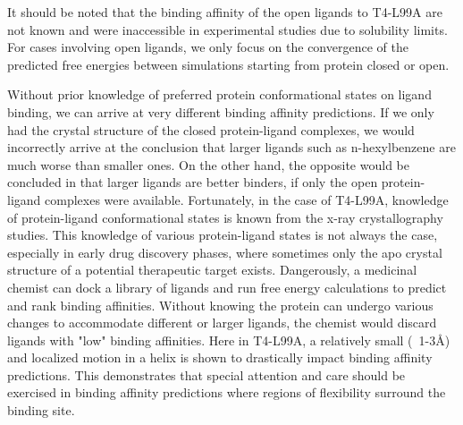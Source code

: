 \documentclass{article}
\begin{document}
It should be noted that the binding affinity of the open ligands to T4-L99A are not known and were inaccessible in experimental studies due to solubility limits. \cite{Merski2015}
For cases involving open ligands, we only focus on the convergence of the predicted free energies between simulations starting from protein closed or open.

Without prior knowledge of preferred protein conformational states on ligand binding, we can arrive at very different binding affinity predictions.
If we only had the crystal structure of the closed protein-ligand complexes, we would incorrectly arrive at the conclusion that larger ligands such as n-hexylbenzene are much worse than smaller ones.
On the other hand, the opposite would be concluded in that larger ligands are better binders, if only the open protein-ligand complexes were available.
Fortunately, in the case of T4-L99A, knowledge of protein-ligand conformational states is known from the x-ray crystallography studies. \cite{Merski2015}
This knowledge of various protein-ligand states is not always the case, especially in early drug discovery phases, where sometimes only the apo crystal structure of a potential therapeutic target exists.
Dangerously, a medicinal chemist can dock a library of ligands and run free energy calculations to predict and rank binding affinities.
Without knowing the protein can undergo various changes to accommodate different or larger ligands, the chemist would discard ligands with "low" binding affinities.
Here in T4-L99A, a relatively small (~1-3\AA) and localized motion in a helix is shown to drastically impact binding affinity predictions.
This demonstrates that special attention and care should be exercised in binding affinity predictions where regions of flexibility surround the binding site.
\end{document}
